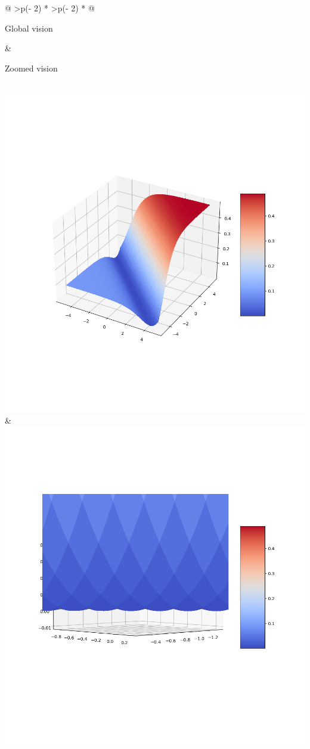 \documentclass[
]{article}
\begin{document}
\begin{longtable}[]{@{}
  >{\centering\arraybackslash}p{(\columnwidth - 2\tabcolsep) * }
  >{\centering\arraybackslash}p{(\columnwidth - 2\tabcolsep) * }@{}}
\toprule\noalign{}
\begin{minipage}[b]{\linewidth}\centering
Global vision
\end{minipage} & \begin{minipage}[b]{\linewidth}\centering
Zoomed vision
\end{minipage} \\
\midrule\noalign{}
\endhead
\bottomrule\noalign{}
\endlastfoot
\includegraphics{../res/minima.png} &
\includegraphics{../res/minima_zoom.png} \\

\end{longtable}
\end{document}
